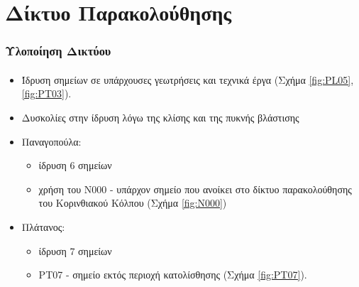 \documentclass{beamer}
\begin{document}

\section{Δίκτυο Παρακολούθησης}

\begin{frame}\frametitle{Υλοποίηση Δικτύου}\framesubtitle{}
\begin{itemize}
	\item Ίδρυση σημείων σε υπάρχουσες γεωτρήσεις και τεχνικά έργα (Σχήμα \ref{fig:PL05}, \ref{fig:PT03}).
	\item Δυσκολίες στην ίδρυση λόγω της κλίσης και της πυκνής βλάστισης
	\item  Παναγοπούλα:
	\begin{itemize}
		\item ίδρυση 6 σημείων
		\item χρήση του Ν000 - υπάρχον σημείο που ανοίκει στο δίκτυο παρακολούθησης του Κορινθιακού Κόλπου (Σχήμα \ref{fig:N000})
	\end{itemize}
	\item Πλάτανος:
	\begin{itemize}
		\item ίδρυση 7 σημείων
		\item PT07 - σημείο εκτός περιοχή κατολίσθησης (Σχήμα \ref{fig:PT07}).
	\end{itemize}
\end{itemize}
\end{frame}
\end{document}
